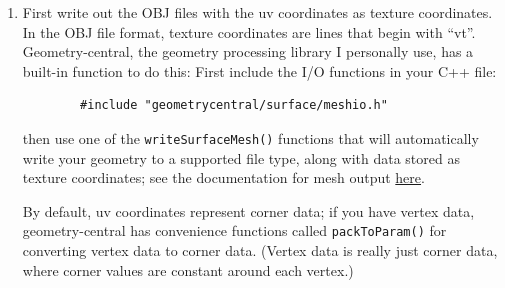 \documentclass[10pt]{article}
\begin{document}
\begin{enumerate}
    \item First write out the OBJ files with the uv coordinates as texture coordinates. In the OBJ file format, texture coordinates are lines that begin with ``vt''. Geometry-central, the geometry processing library I personally use, has a built-in function to do this: First include the I/O functions in your C++ file:
        \begin{verbatim}
        #include "geometrycentral/surface/meshio.h"
        \end{verbatim}
        \vspace{-2ex}
        then use one of the {\tt writeSurfaceMesh()} functions that will automatically write your geometry to a supported file type, along with data stored as texture coordinates; see the documentation for mesh output \href{https://geometry-central.net/surface/utilities/io/#writing-meshes}{here}. 
        
        By default, uv coordinates represent corner data; if you have vertex data, geometry-central has convenience functions called {\tt packToParam()} for converting vertex data to corner data. (Vertex data is really just corner data, where corner values are constant around each vertex.)
        

\end{enumerate}
\end{document}
